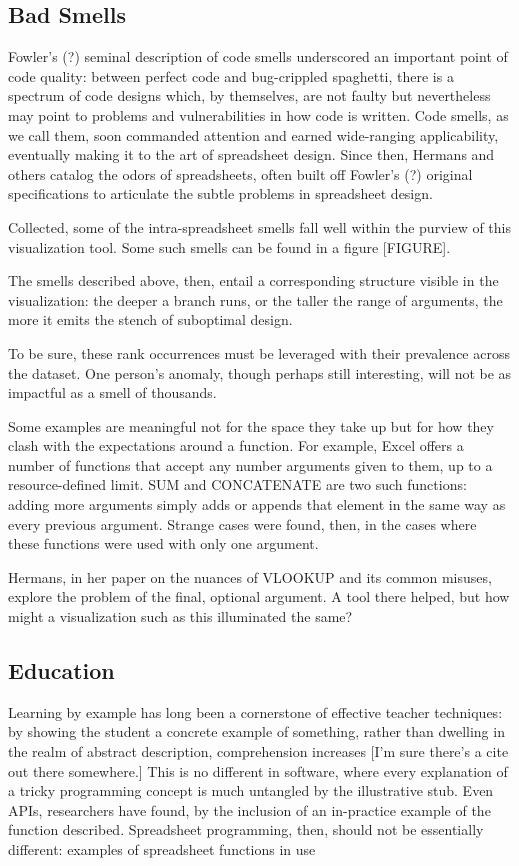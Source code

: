 \documentclass[conference]{IEEEtran}
\begin{document}
\subsection{Bad Smells}
Fowler's (?) seminal description of code smells underscored
an important point of code quality: between perfect code and 
bug-crippled spaghetti,  there is a spectrum of code designs 
which, by themselves, are not faulty but nevertheless may
point to problems and vulnerabilities in how code is written.
Code smells, as we call them, soon commanded attention and earned wide-ranging 
applicability, eventually making it to the art of spreadsheet design.
Since then, Hermans and others catalog the odors of spreadsheets, 
often built off Fowler's (?) original specifications to articulate
the subtle problems in spreadsheet design. \par 
Collected, some of the intra-spreadsheet smells fall well within the
purview of this visualization tool. Some such smells can be found
in a figure [FIGURE]. \par 
The smells described above, then, entail a corresponding structure
visible in the visualization: the deeper a branch runs, or the
taller the range of arguments, the more it emits the stench of suboptimal
design. \par 
To be sure, these rank occurrences must be leveraged with their prevalence
across the dataset. One person's anomaly, though perhaps still interesting,
will not be as impactful as a smell of thousands. \par
Some examples are meaningful not for the space they take up but for how
they clash with the expectations around a function. For example, Excel
offers a number of functions that accept any number arguments given to 
them, up to a resource-defined limit. SUM and CONCATENATE are two such functions:
adding more arguments simply adds or appends that element in the same way
as every previous argument. Strange cases were found, then, in the cases where
these functions were used with only one argument. \par
Hermans, in her paper on the nuances of VLOOKUP and its common misuses, explore
the problem of the final, optional argument. A tool there helped, but how might
a visualization such as this illuminated the same?

\subsection{Education}
Learning by example has long been a cornerstone of effective teacher techniques:
by showing the student a concrete example of something, rather than dwelling in
the realm of abstract description, comprehension increases [I'm sure there's a cite
out there somewhere.] This is no different in software, where every explanation of
a tricky programming concept is much untangled by the illustrative stub. Even APIs,
researchers have found, by the inclusion of an in-practice example of the function
described. Spreadsheet programming, then, should not be essentially different: 
examples of spreadsheet functions in use
\end{document}
